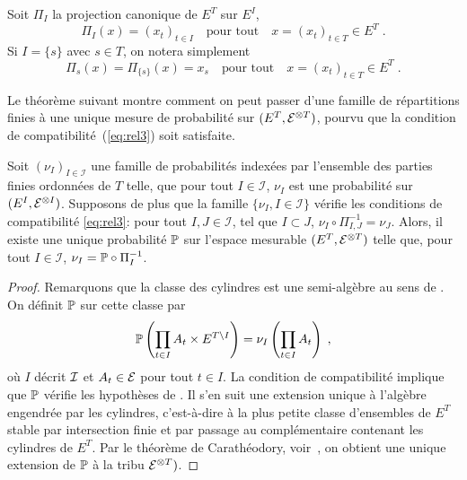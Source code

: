 Soit $\Pi_I$ la projection canonique de $E^T$ sur $E^I$,
\begin{equation}
\label{eq:projectioncanonique}
\Pi_I( x ) = (x_t)_{t \in I}\quad \text{pour tout}\quad x=(x_t)_{t \in T} \in E^T\;.
\end{equation}
Si $I=\{s\}$ avec $s\in T$, on notera simplement
\begin{equation}
\label{eq:projectioncanoniquesingle}
\Pi_s( x ) =\Pi_{\{s\}}( x )= x_s\quad \text{pour tout}\quad x=(x_t)_{t \in T} \in E^T\;.
\end{equation}

Le th\'eor\`eme suivant montre comment on peut passer d'une famille de
r\'epartitions finies \`a une unique mesure de probabilit\'e sur $(E^T,\mathcal{E}^{\otimes
  T})$, pourvu que la condition de compatibilit\'e~(\ref{eq:rel3}) soit
satisfaite.

\begin{theorem}
\label{th:kolmogorov}
Soit $(\nu_I)_{I \in \mathcal{I}}$ une famille de probabilit\'es
index\'ees par l'ensemble des parties finies ordonn\'ees de $T$ telle, que pour tout $I \in \mathcal{I}$,
$\nu_I$ est une probabilit\'e sur $(E^I, \mathcal{E}^{\otimes I})$. Supposons de plus
que la famille $\{ \nu_I, I \in \mathcal{I} \}$ v\'erifie les conditions
de compatibilit\'e \eqref{eq:rel3}: pour tout $I,J \in \mathcal{I}$, tel que
$I \subset J$, $\nu_I \circ \Pi_{I,J}^{-1} = \nu_J$. Alors, il existe
une unique probabilit\'e $\mathbb{P}$ sur l'espace mesurable $(E^T,\mathcal{E}^{\otimes T})$
telle que, pour tout $I \in \mathcal{I}$, $\nu_I = \mathbb{P} \circ \Pi_I^{-1}$.
\end{theorem}
\begin{proof}
Remarquons que la classe des cylindres est une semi-alg\`ebre au sens de
\cite[p.~297]{royden:1988}. On d\'efinit $\mathbb{P}$ sur cette classe par
$$
\mathbb{P}\left(\prod_{t\in I}A_{t}\times E^{T\setminus I}\right)=\nu_I \left(\prod_{t\in I}A_{t}\right)\;,
$$
o\`u $I$ d\'ecrit $\mathcal{I}$ et $A_t\in\mathcal{E}$ pour tout $t \in I$. La condition
de compatibilit\'e implique que $\mathbb{P}$ v\'erifie les hypoth\`eses de
\cite[Proposition~9]{royden:1988}. Il s'en suit une extension unique \`a
l'alg\`ebre engendr\'ee par les cylindres, c'est-\`a-dire \`a la plus petite
classe d'ensembles de $E^T$ stable par intersection finie et par
passage au compl\'ementaire contenant les cylindres de $E^T$. Par le
th\'eor\`eme de Carath\'eodory, voir~\cite[Th\'eor\`eme~8]{royden:1988}, on
obtient une unique extension de $\mathbb{P}$ \`a la tribu $\mathcal{E}^{\otimes T})$.
\end{proof}

